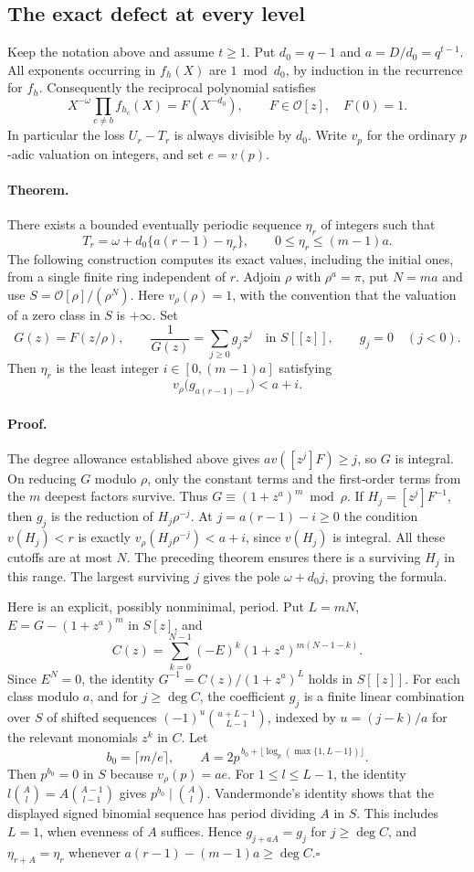 \subsection{The exact defect at every level}
Keep the notation above and assume $t\ge1$. Put $d_0=q-1$ and $a=D/d_0=q^{t-1}$. All exponents occurring in $f_h(X)$ are $1\bmod d_0$, by induction in the recurrence for $f_h$. Consequently the reciprocal polynomial satisfies
\[
   X^{-\omega}\prod_{c\ne b} f_{h_c}(X)=F(X^{-d_0}),\qquad F\in\mathcal O[z],\quad F(0)=1 .
\]
In particular the loss $U_r-T_r$ is always divisible by $d_0$. Write $v_p$ for the ordinary $p$-adic valuation on integers, and set $e=v(p)$.

\paragraph{Theorem.}
There exists a bounded eventually periodic sequence $\eta_r$ of integers such that
\[
 T_r=\omega+d_0\{a(r-1)-\eta_r\},\qquad 0\le\eta_r\le (m-1)a.
\]
The following construction computes its exact values, including the initial ones, from a single finite ring independent of $r$.
Adjoin $\rho$ with $\rho^a=\pi$, put $N=ma$ and use
$S=\mathcal O[\rho]/(\rho^N)$. Here $v_\rho(\rho)=1$, with the convention that the valuation of a zero class in $S$ is $+\infty$. Set
\[
 G(z)=F(z/\rho),\qquad
 \frac1{G(z)}=\sum_{j\ge0}g_jz^j\quad\text{in }S[[z]],\qquad g_j=0\quad(j<0).
\]
Then $\eta_r$ is the least integer $i\in[0,(m-1)a]$ satisfying
\[
             v_\rho\bigl(g_{a(r-1)-i}\bigr)<a+i .
\]
\paragraph{Proof.}
The degree allowance established above gives $a v([z^j]F)\ge j$, so $G$ is integral. On reducing $G$ modulo $\rho$, only the constant terms and the first-order terms from the $m$ deepest factors survive. Thus $G\equiv(1+z^a)^m\bmod\rho$. If $H_j=[z^j]F^{-1}$, then $g_j$ is the reduction of $H_j\rho^{-j}$. At $j=a(r-1)-i\ge0$ the condition $v(H_j)<r$ is exactly $v_\rho(H_j\rho^{-j})<a+i$, since $v(H_j)$ is integral. All these cutoffs are at most $N$. The preceding theorem ensures there is a surviving $H_j$ in this range. The largest surviving $j$ gives the pole $\omega+d_0 j$, proving the formula.

Here is an explicit, possibly nonminimal, period. Put $L=mN$, $E=G-(1+z^a)^m$ in $S[z]$, and
\[
 C(z)=\sum_{k=0}^{N-1}(-E)^k(1+z^a)^{m(N-1-k)} .
\]
Since $E^N=0$, the identity $G^{-1}=C(z)/(1+z^a)^L$ holds in $S[[z]]$. For each class modulo $a$, and for $j\ge\deg C$, the coefficient $g_j$ is a finite linear combination over $S$ of shifted sequences $(-1)^u\binom{u+L-1}{L-1}$, indexed by $u=(j-k)/a$ for the relevant monomials $z^k$ in $C$. Let
\[
 b_0=\lceil m/e\rceil,\qquad
 A=2p^{\,b_0+\lfloor\log_p(\max\{1,L-1\})\rfloor}.
\]
Then $p^{b_0}=0$ in $S$ because $v_\rho(p)=ae$. For $1\le l\le L-1$, the identity $l\binom A l=A\binom{A-1}{l-1}$ gives $p^{b_0}\mid\binom A l$. Vandermonde's identity shows that the displayed signed binomial sequence has period dividing $A$ in $S$. This includes $L=1$, when evenness of $A$ suffices. Hence $g_{j+aA}=g_j$ for $j\ge\deg C$, and $\eta_{r+A}=\eta_r$ whenever $a(r-1)-(m-1)a\ge\deg C$.\hfill$\square$

